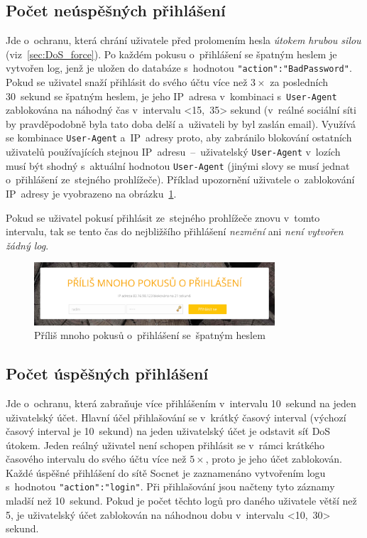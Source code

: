 \subsection*{Počet neúspěšných přihlášení}
\label{sec:num_of_unsucc_logins}
Jde o~ochranu, která chrání uživatele před prolomením hesla \textit{útokem hrubou silou} (viz~\ref{sec:DoS_force}). Po každém pokusu o~přihlášení se špatným heslem je vytvořen log, jenž je uložen do databáze s~hodnotou \texttt{"action":"BadPassword"}. Pokud se uživatel snaží přihlásit do svého účtu více než $3\times$ za posledních 30~sekund se špatným heslem, je jeho IP~adresa v~kombinaci s~\texttt{User-Agent} zablokována na náhodný čas v~intervalu <15,~35> sekund (v~reálné sociální síti by pravděpodobně byla tato doba delší a~uživateli by byl zaslán email). Využívá se kombinace \texttt{User-Agent} a~IP~adresy proto, aby zabránilo blokování ostatních uživatelů používajících stejnou IP~adresu~--~uživatelský \texttt{User-Agent} v~lozích musí být shodný s~aktuální hodnotou \texttt{User-Agent} (jinými slovy se musí jednat o~přihlášení ze~stejného prohlížeče). Příklad upozornění uživatele o~zablokování IP~adresy je vyobrazeno na obrázku~\ref{img:blocked_IP}.

Pokud se uživatel pokusí přihlásit ze~stejného prohlížeče znovu v~tomto intervalu, tak se tento čas do nejbližšího přihlášení \textit{nezmění} ani \textit{není vytvořen žádný log}. 

\begin{figure}[H]
	\centering
	\includegraphics[width=0.8\textwidth]{images/blocked_IP.jpg}
	\caption{Příliš mnoho pokusů o~přihlášení se~špatným heslem}
	\label{img:blocked_IP}
\end{figure}


\subsection*{Počet úspěšných přihlášení}
\label{sec:num_of_succ_logins}
Jde o~ochranu, která zabraňuje více přihlášením v~intervalu 10~sekund na jeden uživatelský účet. Hlavní účel přihlašování se v~krátký časový interval (výchozí časový interval je 10~sekund) na jeden uživatelský účet je odstavit síť DoS útokem. Jeden reálný uživatel není schopen přihlásit se v~rámci krátkého časového intervalu do svého účtu více než $5\times$, proto je jeho účet zablokován. Každé úspěšné přihlášení do sítě Socnet je zaznamenáno vytvořením logu s~hodnotou \texttt{"action":"login"}. Při přihlašování jsou načteny tyto záznamy mladší než 10~sekund. Pokud je počet těchto logů pro daného uživatele větší než 5, je uživatelský účet zablokován na náhodnou dobu v~intervalu <10,~30> sekund.

